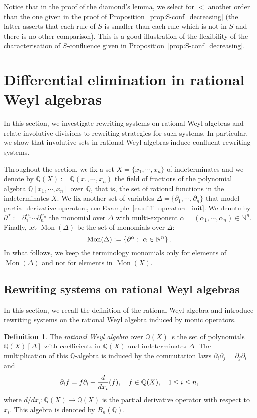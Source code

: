 \documentclass[11pt]{article}
\theoremstyle{definition}
\newtheorem{definition}[theorem]{Definition}
\newcommand\diff[1]{\partial_{#1}}
\newcommand\Q{\mathbb{Q}}
\newcommand\N{\mathbb{N}}
\newcommand\QX{\mathbb{Q}[x_1,\cdots,x_n]}
\newcommand\QXX{\mathbb{Q}(x_1,\cdots,x_n)}
\newcommand\Weyl[1]{B_{#1}(\Q)}
\newcommand\monBasis{\Mon(\Delta)}
\DeclareMathOperator{\Mon}{Mon}
\begin{document}
Notice that in the proof of the diamond's lemma, we select for $<$
another order than the one given in the proof of
Proposition~\ref{prop:S-conf_decreasing} (the latter asserts that each
rule of $S$ is smaller than each rule which is not in $S$ and there is no
other comparison). This is a good illustration of the flexibility of the
characterisation of $S$-confluence given in
Proposition~\ref{prop:S-conf_decreasing}. 

\section{Differential elimination in rational Weyl algebras}
\label{sec:differential_elimination_in_rational_Weyl_algebras}

In this section, we investigate rewriting systems on rational Weyl
algebras and relate involutive divisions to rewriting strategies for such
systems. In particular, we show that involutive sets in rational Weyl
algebras induce confluent rewriting systems.
\medskip

Throughout the section, we fix a set $X=\{x_1,\cdots,x_n\}$ of
indeterminates and we denote by $\Q(X):=\QXX$ the field of fractions of
the polynomial algebra $\QX$ over~$\Q$, that is, the set of rational
functions in the indeterminates $X$. We fix another set of variables
$\Delta=\{\diff{1},\cdots,\diff{n}\}$ that model partial derivative
operators, see Example~\ref{ex:diff_operators_init}. We denote by
$\partial^{\alpha}:=\diff{1}^{\alpha_1}\cdots\diff{n}^{\alpha_n}$ the
monomial over $\Delta$ with multi-exponent
$\alpha=(\alpha_1,\cdots,\alpha_n)\in\N^n$. Finally, let $\monBasis$ be
the set of monomials over $\Delta$:
\[\monBasis:=\left\{\partial^\alpha:\ \alpha\in\N^n\right\}.
\smallskip\]
In what follows, we keep the terminology monomials only for elements of
$\Mon(\Delta)$ and not for elements in $\Mon(X)$.

\subsection{Rewriting systems on rational Weyl algebras}
\label{sec:rewriting_systems_on_Weyl_algebras}

In this section, we recall the definition of the rational Weyl algebra
and introduce rewriting systems on the rational Weyl algebra induced by
monic operators.
\medskip

\begin{definition}
  The {\it rational Weyl algebra} over $\Q(X)$ is the set of polynomials
  $\Q(X)[\Delta]$ with coefficients in $\Q(X)$ and indeterminates
  $\Delta$. The multiplication of this $\mathbb Q$-algebra is induced by
  the commutation laws $\partial_i\partial_j=\partial_j\partial_i$ and
  \[\diff{i}f=f\diff{i}+\frac{d}{dx_i}(f),\quad f\in\Q(X),\quad
  1\leq i\leq n,
  \smallskip\]
  where $d/dx_i:\Q(X)\to\Q(X)$ is the partial derivative operator with
  respect to~$x_i$. This algebra is denoted by $\Weyl{n}$.
\end{definition}
\smallskip
\end{document}
